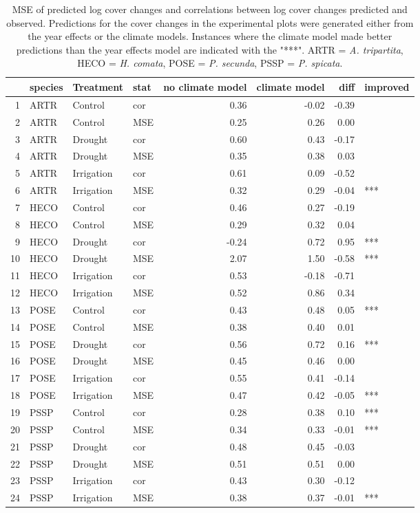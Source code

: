 \begin{table}[H]
\centering
\caption{MSE of predicted log cover changes and correlations between log cover changes predicted and observed. Predictions for the cover changes in the experimental plots were generated either from the year effects or the climate models. Instances where the climate model made better predictions than the year effects model are indicated with the "***". ARTR = \textit{A. tripartita}, HECO = \textit{H. comata}, POSE = \textit{P. secunda}, PSSP = \textit{P. spicata}.} 
\label{table:corPGR}
\begin{tabular}{rlllrrrl}
  \hline
 & species & Treatment & stat & no climate model & climate model & diff & improved \\ 
  \hline
1 & ARTR & Control & cor & 0.36 & -0.02 & -0.39 &  \\ 
  2 & ARTR & Control & MSE & 0.25 & 0.26 & 0.00 &  \\ 
  3 & ARTR & Drought & cor & 0.60 & 0.43 & -0.17 &  \\ 
  4 & ARTR & Drought & MSE & 0.35 & 0.38 & 0.03 &  \\ 
  5 & ARTR & Irrigation & cor & 0.61 & 0.09 & -0.52 &  \\ 
  6 & ARTR & Irrigation & MSE & 0.32 & 0.29 & -0.04 & *** \\ 
  7 & HECO & Control & cor & 0.46 & 0.27 & -0.19 &  \\ 
  8 & HECO & Control & MSE & 0.29 & 0.32 & 0.04 &  \\ 
  9 & HECO & Drought & cor & -0.24 & 0.72 & 0.95 & *** \\ 
  10 & HECO & Drought & MSE & 2.07 & 1.50 & -0.58 & *** \\ 
  11 & HECO & Irrigation & cor & 0.53 & -0.18 & -0.71 &  \\ 
  12 & HECO & Irrigation & MSE & 0.52 & 0.86 & 0.34 &  \\ 
  13 & POSE & Control & cor & 0.43 & 0.48 & 0.05 & *** \\ 
  14 & POSE & Control & MSE & 0.38 & 0.40 & 0.01 &  \\ 
  15 & POSE & Drought & cor & 0.56 & 0.72 & 0.16 & *** \\ 
  16 & POSE & Drought & MSE & 0.45 & 0.46 & 0.00 &  \\ 
  17 & POSE & Irrigation & cor & 0.55 & 0.41 & -0.14 &  \\ 
  18 & POSE & Irrigation & MSE & 0.47 & 0.42 & -0.05 & *** \\ 
  19 & PSSP & Control & cor & 0.28 & 0.38 & 0.10 & *** \\ 
  20 & PSSP & Control & MSE & 0.34 & 0.33 & -0.01 & *** \\ 
  21 & PSSP & Drought & cor & 0.48 & 0.45 & -0.03 &  \\ 
  22 & PSSP & Drought & MSE & 0.51 & 0.51 & 0.00 &  \\ 
  23 & PSSP & Irrigation & cor & 0.43 & 0.30 & -0.12 &  \\ 
  24 & PSSP & Irrigation & MSE & 0.38 & 0.37 & -0.01 & *** \\ 
   \hline
\end{tabular}
\end{table}
